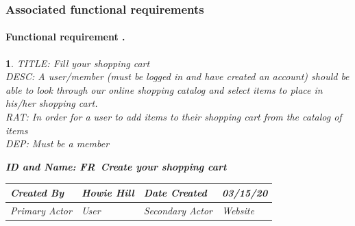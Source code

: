 \documentclass{scrreprt}
\theoremstyle{funreq}
\newtheorem{funreq}{}
\begin{document}
	\subsubsection{Associated functional requirements}
	
	\paragraph[]{Functional requirement .}
	\begin{funreq}
		
		\label{cart_add}
		TITLE: Fill your shopping cart\\
		DESC: A user/member (must be logged in and have created an account) should be able to look through our online shopping catalog and select items to place in his/her shopping cart. \\
		RAT: In order for a user to add items to their shopping cart from the catalog of items\\
		DEP: Must be a member\\
		

		\begin{table}[H]
		\begin{flushleft}\bfseries{ID and Name: FR\thefunreq ~\hspace{.6cm}Create your shopping cart}\end{flushleft}
			\begin{tabularx}{\columnwidth}{|X|X|X|X|}
				\hline
				Created By    & Howie Hill & Date Created    & 03/15/20 \\ \hline
				Primary Actor & User        & Secondary Actor & Website \\ \hline
			\end{tabularx}
		

\end{table}
\end{funreq}
\end{document}
